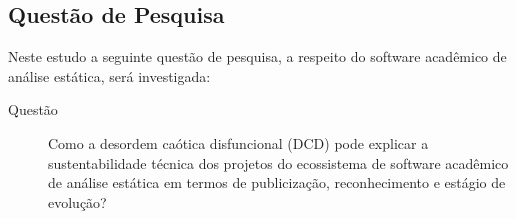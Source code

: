 
\subsection{Questão de Pesquisa}

\newcommand{\QuestaoGeralUm}{
  Como a desordem caótica disfuncional (DCD) pode explicar a sustentabilidade técnica
  dos projetos do ecossistema de software acadêmico de análise estática em
  termos de publicização, reconhecimento e estágio de evolução?
}

Neste estudo a seguinte questão de pesquisa, a respeito do software acadêmico
de análise estática, será investigada:

\begin{description}
  \item [Questão] \QuestaoGeralUm
\end{description}



